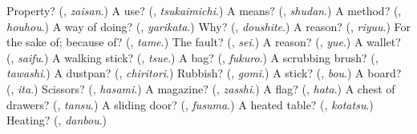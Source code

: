 \begin{tcolorbox}[breakable,colback=teal!4,colframe=teal!35!black,title={Before you move on}]
Property? (\textbf{}, \emph{zaisan}.) A use? (\textbf{}, \emph{tsukaimichi}.) A means? (\textbf{}, \emph{shudan}.) A method? (\textbf{}, \emph{houhou}.) A way of doing? (\textbf{}, \emph{yarikata}.) Why? (\textbf{}, \emph{doushite}.) A reason? (\textbf{}, \emph{riyuu}.) For the sake of; because of? (\textbf{}, \emph{tame}.) The fault? (\textbf{}, \emph{sei}.) A reason? (\textbf{}, \emph{yue}.) A wallet? (\textbf{}, \emph{saifu}.) A walking stick? (\textbf{}, \emph{tsue}.) A bag? (\textbf{}, \emph{fukuro}.) A scrubbing brush? (\textbf{}, \emph{tawashi}.) A dustpan? (\textbf{}, \emph{chiritori}.) Rubbish? (\textbf{}, \emph{gomi}.) A stick? (\textbf{}, \emph{bou}.) A board? (\textbf{}, \emph{ita}.) Scissors? (\textbf{}, \emph{hasami}.) A magazine? (\textbf{}, \emph{zasshi}.) A flag? (\textbf{}, \emph{hata}.) A chest of drawers? (\textbf{}, \emph{tansu}.) A sliding door? (\textbf{}, \emph{fusuma}.) A heated table? (\textbf{}, \emph{kotatsu}.) Heating? (\textbf{}, \emph{danbou}.)
\end{tcolorbox}
